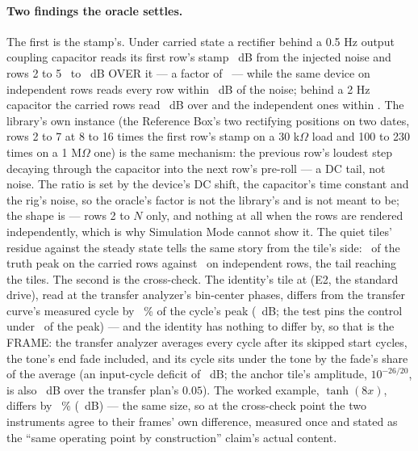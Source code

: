 \documentclass[11pt,a4paper]{article}
\begin{document}
\paragraph{Two findings the oracle settles.} The first is the stamp's.
Under carried state a rectifier behind a 0.5 Hz output coupling
capacitor reads its first row's stamp \mparityTailHalfFirstRow\ dB from
the injected noise and rows 2 to 5 \mparityTailHalfCarriedExcess\ to
\mparityTailHalfCarriedExcessMax\ dB OVER it --- a factor of
\mparityTailHalfCarriedRatio\ --- while the same device on independent
rows reads every row within \mparityTailHalfIndependentExcess\ dB of the
noise; behind a 2 Hz capacitor the carried rows read
\mparityTailTwoCarriedExcess\ dB over and the independent ones within
\mparityTailTwoIndependentExcess. The library's own instance (the
Reference Box's two rectifying positions on two dates, rows 2 to 7 at 8
to 16 times the first row's stamp on a 30 k$\Omega$ load and 100 to 230
times on a 1 M$\Omega$ one) is the same mechanism: the previous row's
loudest step decaying through the capacitor into the next row's pre-roll
--- a DC tail, not noise. The ratio is set by the device's DC shift, the
capacitor's time constant and the rig's noise, so the oracle's factor
is not the library's and is not meant to be; the shape is --- rows 2 to
$N$ only, and nothing at all when the rows are rendered independently,
which is why Simulation Mode cannot show it. The quiet tiles' residue
against the steady state tells the same story from the tile's side:
\mparityTailHalfCarriedResidue\ of the truth peak on the carried rows
against \mparityTailHalfIndependentResidue\ on independent rows, the tail
reaching the tiles. The second is the cross-check. The identity's tile at
(E2, the standard drive), read at the transfer analyzer's bin-center
phases, differs from the transfer curve's measured cycle by
\mparityCrossControl\ \% of the cycle's peak (\mparityCrossControlDB\ dB;
the test pins the control under \mparityCrossControlBar\ of the peak) ---
and the identity has nothing to differ by, so that is the FRAME: the
transfer analyzer averages every cycle after its skipped start cycles,
the tone's end fade included, and its cycle sits under the tone by the
fade's share of the average (an input-cycle deficit of
\mparityCrossDeficit\ dB; the anchor tile's amplitude, $10^{-26/20}$, is
also \mparityCrossRatio\ dB over the transfer plan's $0.05$). The worked
example, $\tanh(8x)$, differs by \mparityCrossDevice\ \%
(\mparityCrossDeviceDB\ dB) --- the same size, so at the cross-check point
the two instruments agree to their frames' own difference, measured once
and stated as the ``same operating point by construction'' claim's
actual content.
\end{document}
